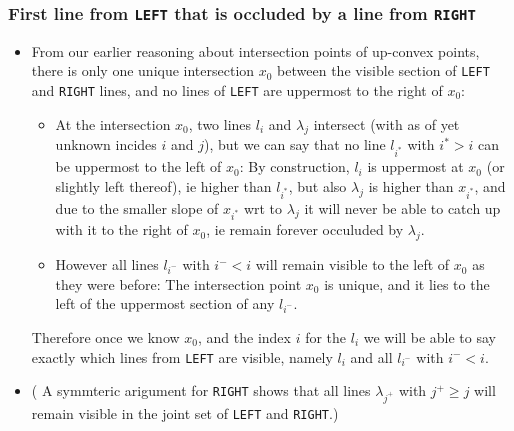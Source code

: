 \documentclass[ignorenonframetext,]{beamer}
\begin{document}
\begin{frame}
  \frametitle{First line from \texttt{LEFT} that is occluded by a line
  from \texttt{RIGHT}}

\begin{itemize}
\item From our earlier reasoning about intersection points of up-convex
  points, there is only one unique intersection $x_0$ between the visible section
  of \texttt{LEFT} and \texttt{RIGHT} lines, and no lines of
  \texttt{LEFT} are uppermost to the right of $x_0$:
  \begin{itemize}
  \item At the intersection $x_0$, two lines $l_i$ and $\lambda_j$
    intersect (with as of yet unknown incides $i$ and $j$), but we can
    say that no line $l_{i^*}$ with $i^* > i$ can be uppermost to the
    left of $x_0$: By construction, $l_i$ is uppermost at $x_0$ (or
    slightly left thereof), ie
    higher than $l_{i^*}$, but also $\lambda_j$ is higher than $x_{i^*}$,
    and due to the smaller slope of $x_{i^*}$ wrt to $\lambda_j$ it
    will never be able to catch up with it to the right of $x_0$, ie
    remain forever occuluded by $\lambda_j$.
  \item However all lines $l_{i^-}$ with $i^- < i$ will remain visible
    to the left of $x_0$ as they were before: The intersection point
    $x_0$ is unique, and it lies to the left of the uppermost section
    of any $l_{i^-}$. 
  \end{itemize}
  Therefore once we know $x_0$, and the index $i$ for the $l_i$ we
  will be able to say exactly which lines from \texttt{LEFT} are
  visible, namely $l_i$ and all $l_{i^-}$ with $i^- < i$. 
\item ( A symmteric arigument for \texttt{RIGHT} shows that all lines
  $\lambda_{j^+}$ with $j^+ \geq j$ will remain visible in the joint
  set of \texttt{LEFT} and \texttt{RIGHT}.)
\end{itemize}

\end{frame}
\end{document}
